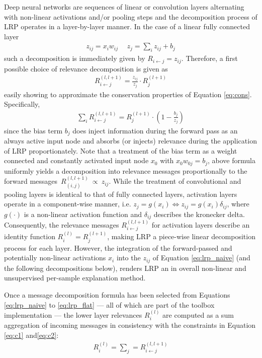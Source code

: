 \documentclass[a4wide]{article}
\begin{document}
Deep neural networks are sequences of linear or convolution layers alternating with non-linear activations and/or pooling steps and the decomposition process of LRP operates in a layer-by-layer manner.
In the case of a linear fully connected layer 
\begin{align}
z_{ij} = x_iw_{ij} ~&~ z_j = \sum\limits_i z_{ij} + b_j
\end{align}
such a decomposition is immediately given by $R_{i\leftarrow j} = z_{ij}$.
Therefore, a first possible choice of  relevance decomposition is given as
\begin{align}
R^{(l,l+1)}_{i\leftarrow j} = \frac{z_{ij}}{z_j}\cdot R_j^{(l+1)}
\label{eq:lrp_naive}
\end{align}
easily showing to approximate the conservation properties of Equation \ref{eq:cons}. Specifically, 
\begin{align}
\sum\limits_i R^{(l,l+1)}_{i\leftarrow j} = R_j^{(l+1)} \cdot (1 - \frac{b_j}{z_j})
\end{align}
since the bias term $b_j$ does inject information during the forward pass as an always active input node and absorbs (or injects) relevance during the application of LRP proportionately. Note that a treatment of the bias term as a weight connected and constantly activated input node  $x_0$ with $x_0w_{0j}=b_j$, above formula uniformly yields a decomposition into relevance messages proportionally to the forward messages~$R_{(i,j)}^{(l,l+1)}~\propto~z_{ij}$.
While the treatment of convolutional and pooling layers is identical to that of fully connected layers, activation layers operate in a component-wise manner, i.e. $z_{j} = g(x_i) \Leftrightarrow z_{ij}  = g(x_i)\delta_{ij}$, where $g(\cdot)$ is a non-linear activation function and $\delta_{ij}$ describes the kronecker delta.
Consequently, the relevance messages $R^{(l,l+1)}_{i\leftarrow j}$ for activation layers describe an identity function $R^{(l)}_i = R^{(l+1)}_j$, making LRP a piece-wise linear decomposition process for each layer.
However, the integration of the forward-passed and potentially non-linear activations $x_i$ into the $z_{ij}$ of Equation \ref{eq:lrp_naive} (and the following decompositions below), renders LRP an in overall non-linear and unsupervised per-sample explanation method.

Once a message decomposition formula has been selected from Equations \ref{eq:lrp_naive} to \ref{eq:lrp_flat} --- all of which are part of the toolbox implementation --- the lower layer relevances $R^{(l)}_i$ are computed as a sum aggregation of incoming messages in consistency with the constraints in Equation \ref{eq:c1} and\ref{eq:c2}:
\begin{align}
R_i^{(l)} = \sum\limits_j = R^{(l,l+1)}_{i \leftarrow j}
\end{align}
\end{document}
